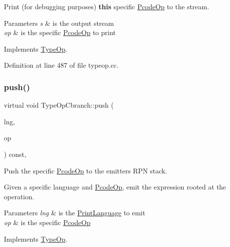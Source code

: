Print (for debugging purposes) {\bfseries{this}} specific \mbox{\hyperlink{class_pcode_op}{Pcode\+Op}} to the stream. 


\begin{DoxyParams}{Parameters}
{\em s} & is the output stream \\
\hline
{\em op} & is the specific \mbox{\hyperlink{class_pcode_op}{Pcode\+Op}} to print \\
\hline
\end{DoxyParams}


Implements \mbox{\hyperlink{class_type_op_a60717e486917a30cc7cb6e3ce02585e1}{Type\+Op}}.



Definition at line 487 of file typeop.\+cc.

\mbox{\label{class_type_op_cbranch_a5798175bf1004bd4af848b14e6e0b46c}} 
\subsubsection{\texorpdfstring{push()}{push()}}
{\footnotesize\ttfamily virtual void Type\+Op\+Cbranch\+::push (\begin{DoxyParamCaption}\item[{\mbox{\hyperlink{class_print_language}{Print\+Language}} $\ast$}]{lng,  }\item[{const \mbox{\hyperlink{class_pcode_op}{Pcode\+Op}} $\ast$}]{op }\end{DoxyParamCaption}) const\hspace{0.3cm}{\ttfamily [inline]}, {\ttfamily [virtual]}}



Push the specific \mbox{\hyperlink{class_pcode_op}{Pcode\+Op}} to the emitter\textquotesingle{}s R\+PN stack. 

Given a specific language and \mbox{\hyperlink{class_pcode_op}{Pcode\+Op}}, emit the expression rooted at the operation. 
\begin{DoxyParams}{Parameters}
{\em lng} & is the \mbox{\hyperlink{class_print_language}{Print\+Language}} to emit \\
\hline
{\em op} & is the specific \mbox{\hyperlink{class_pcode_op}{Pcode\+Op}} \\
\hline
\end{DoxyParams}


Implements \mbox{\hyperlink{class_type_op_ac9c9544203ed74dabe6ac662b653b2af}{Type\+Op}}.



